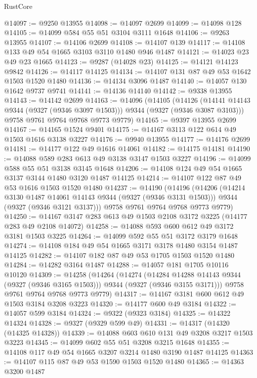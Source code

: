 \begin{lexlean}{RustCore}
\begin{coremodule}
@14097 := @9250 @13955
@14098 := @14097 @2699
@14099 := @14098 @128
@14105 := @14099 @584 @55 @51 @3104 @3111 @1648
@14106 := @9263 @13955
@14107 := @14106 @2699
@14108 := @14107 @139
@14117 := @14108 @133 @49 @54 @1665 @3103 @3110 @1480 @946 @1487
@14121 := @14023 @23 @49 @23 @1665
@14123 := @9287 (@14028 @23)
@14125 := @14121 @14123 @9842
@14126 := @14117 @14125
@14134 := @14107 @131 @87 @49 @53 @1642 @1503 @1520 @1480
@14136 := @14134 @3096 @1487
@14140 := @14057 @130 @1642 @9737 @9741
@14141 := @14136 @14140
@14142 := @9338 @13955
@14143 := @14142 @2699
@14163 := @14096
    (@14105
      (@14126 (@14141 @14143 @9344 (@9327 (@9346 @3097 @1503))) @9344 (@9327 (@9346 @3087 @3103)))
      @9758
      @9761
      @9764
      @9768
      @9773
      @9779)
@14165 := @9397 @13955 @2699
@14167 := @14165 @1524 @9401
@14175 := @14167 @3113 @122 @614 @49 @1503 @1616 @3138 @3227
@14176 := @9940 @13955
@14177 := @14176 @2699
@14181 := @14177 @122 @49 @1616 @14061
@14182 := @14175 @14181
@14190 := @14088 @589 @283 @613 @49 @3138 @3147 @1503 @3227
@14196 := @14099 @588 @55 @51 @3138 @3145 @1648
@14206 := @14108 @124 @49 @54 @1665 @3137 @3144 @1480 @3120 @1487 @14125
@14214 := @14107 @122 @87 @49 @53 @1616 @1503 @1520 @1480
@14237 := @14190
    (@14196
      (@14206
        (@14214 @3130 @1487 @14061 @14143 @9344 (@9327 (@9346 @3131 @1503)))
        @9344
        (@9327 (@9346 @3121 @3137)))
      @9758
      @9761
      @9764
      @9768
      @9773
      @9779)
@14250 := @14167 @3147 @283 @613 @49 @1503 @2108 @3172 @3225 (@14177 @283 @49 @2108 @14072)
@14258 := @14088 @593 @600 @612 @49 @3172 @3181 @1503 @3225
@14264 := @14099 @592 @55 @51 @3172 @3179 @1648
@14274 := @14108 @184 @49 @54 @1665 @3171 @3178 @1480 @3154 @1487 @14125
@14282 := @14107 @182 @87 @49 @53 @1705 @1503 @1520 @1480
@14284 := @14282 @3164 @1487
@14288 := @14057 @181 @1705 @10116 @10120
@14309 := @14258
    (@14264
      (@14274
        (@14284 @14288 @14143 @9344 (@9327 (@9346 @3165 @1503)))
        @9344
        (@9327 (@9346 @3155 @3171)))
      @9758
      @9761
      @9764
      @9768
      @9773
      @9779)
@14317 := @14167 @3181 @600 @612 @49 @1503 @3184 @3208 @3223
@14320 := @14177 @600 @49 @3184
@14322 := @14057 @599 @3184
@14324 := @9322 (@9323 @3184)
@14325 := @14322 @14324
@14328 := @9327 (@9329 @599 @49)
@14331 := @14317 (@14320 (@14325 @14328))
@14339 := @14088 @603 @610 @131 @49 @3208 @3217 @1503 @3223
@14345 := @14099 @602 @55 @51 @3208 @3215 @1648
@14355 := @14108 @117 @49 @54 @1665 @3207 @3214 @1480 @3190 @1487 @14125
@14363 := @14107 @115 @87 @49 @53 @1590 @1503 @1520 @1480
@14365 := @14363 @3200 @1487

\end{coremodule}
\end{lexlean}
